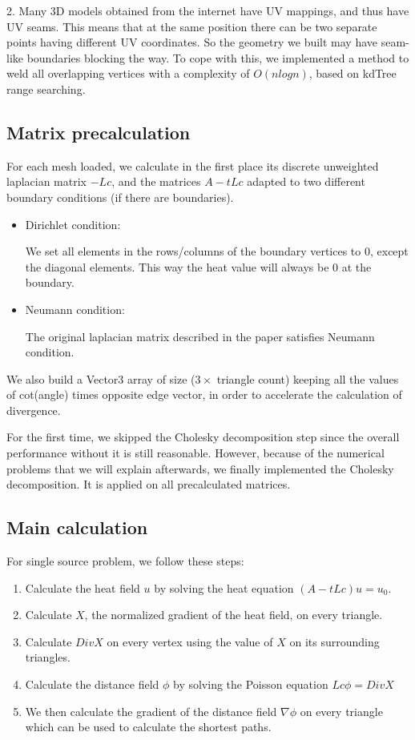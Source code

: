 \documentclass[a4paper,12pt,twoside]{article}
\begin{document}
2. Many 3D models obtained from the internet have UV mappings, and thus have UV seams. This means that at the same position there can be two separate points having different UV coordinates. So the geometry we built may have seam-like boundaries blocking the way. To cope with this, we implemented a method to weld all overlapping vertices with a complexity of $O(nlogn)$, based on kdTree range searching.\\


\subsection{Matrix precalculation}

For each mesh loaded, we calculate in the first place its discrete unweighted laplacian matrix $-Lc$, and the matrices $A-tLc$ adapted to two different boundary conditions (if there are boundaries).

\begin{itemize}
\item
Dirichlet condition:

We set all elements in the rows/columns of the boundary vertices to 0, except the diagonal elements. This way the heat value will always be 0 at the boundary.

\item
Neumann condition:

The original laplacian matrix described in the paper satisfies Neumann condition.
\end{itemize}


We also build a Vector3 array of size ($3 \times$ triangle count) keeping all the values of cot(angle) times opposite edge vector, in order to accelerate the calculation of divergence.

For the first time, we skipped the Cholesky decomposition step since the overall performance without it is still reasonable. However, because of the numerical problems that we will explain afterwards, we finally implemented the Cholesky decomposition. It is applied on all precalculated matrices.

\subsection{Main calculation}

For single source problem, we follow these steps:

\begin{enumerate}
\item
Calculate the heat field $u$ by solving the heat equation $(A-tLc)u = u_0$.
\item
Calculate $X$, the normalized gradient of the heat field, on every triangle.
\item
Calculate $DivX$ on every vertex using the value of $X$ on its surrounding triangles.
\item
Calculate the distance field $\phi$ by solving the Poisson equation $Lc \phi = DivX$
\item
We then calculate the gradient of the distance field $\nabla \phi$ on every triangle which can be used to calculate the shortest paths.
\end{enumerate}
\end{document}
